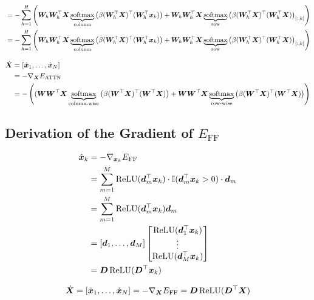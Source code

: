 \begin{align*}
&= -\sum_{h=1}^H \left({\bm{W}}_h{\bm{W}}_h^\top{\bm{X}}\underbrace{\operatorname{softmax}}_{\text{column}}\left(\beta ({\bm{W}}_h^\top{\bm{X}})^\top({\bm{W}}_h^\top{\bm{x}}_k)\right) + {\bm{W}}_h {\bm{W}}_h^\top {\bm{X}} \underbrace{\operatorname{softmax}}_{\text{row}}\left(\beta ({\bm{W}}_h^\top{\bm{X}})^\top({\bm{W}}_h^\top{\bm{X}})\right)_{[:,k]}\right) \\
&= -\sum_{h=1}^H \left({\bm{W}}_h{\bm{W}}_h^\top{\bm{X}}\underbrace{\operatorname{softmax}}_{\text{column}}\left(\beta ({\bm{W}}_h^\top{\bm{X}})^\top({\bm{W}}_h^\top{\bm{x}}_k)\right) + {\bm{W}}_h {\bm{W}}_h^\top {\bm{X}} \underbrace{\operatorname{softmax}}_{\text{row}}\left(\beta ({\bm{W}}_h^\top{\bm{X}})^\top({\bm{W}}_h^\top{\bm{X}})\right)_{[:,k]}\right)
\end{align*}

\begin{align*}
    \dot{{\bm{X}}} &= [\dot{{\bm{x}}}_1, \dots, \dot{{\bm{x}}}_N] \\
                    &= -\nabla_{{\bm{X}}} E_{\text{ATTN}}  \\
                    &= -\left( ({\bm{W}}{\bm{W}}^\top{\bm{X}} \underbrace{\operatorname{softmax}}_{\text{column-wise}}\left(\beta ({\bm{W}}^\top{\bm{X}})^\top({\bm{W}}^\top{\bm{X}})\right)  
+ {\bm{W}}{\bm{W}}^\top{\bm{X}} \underbrace{\operatorname{softmax}}_{\text{row-wise}}\left(\beta ({\bm{W}}^\top{\bm{X}})^\top({\bm{W}}^\top{\bm{X}})\right) \right) \\
\end{align*}

\subsection[Derivation of the Gradient of EFF]{Derivation of the Gradient of $E_{\text{FF}}$}
\label{section:derivation of E ff}

\begin{align*}
\dot{{\bm{x}}}_k &=  -\nabla_{{\bm{x}}_k}E_{\text{FF}} \\  
&=  \sum_{m=1}^M \operatorname{ReLU}({\bm{d}}_m^\top{\bm{x}}_k)\cdot\mathbb{I}({\bm{d}}_m^\top{\bm{x}}_k >0)\cdot {\bm{d}}_m \\
&= \sum_{m=1}^M \operatorname{ReLU}({\bm{d}}_m^\top{\bm{x}}_k){\bm{d}}_m \\
&=[{\bm{d}}_1, \dots, {\bm{d}}_M]\begin{bmatrix}
    \operatorname{ReLU}({\bm{d}}_1^\top{\bm{x}}_k) \\
    \vdots \\
    \operatorname{ReLU}({\bm{d}}_M^\top{\bm{x}}_k)
\end{bmatrix}\\
&={\bm{D}}\operatorname{ReLU}({\bm{D}}^\top{\bm{x}}_k)
\end{align*}

\begin{equation*}
\dot{{\bm{X}}} = [\dot{{\bm{x}}}_1, \dots, \dot{{\bm{x}}}_N] = -\nabla_{{\bm{X}}} E_{\text{FF}} = {\bm{D}}\operatorname{ReLU}({\bm{D}}^\top{\bm{X}})
\end{equation*}